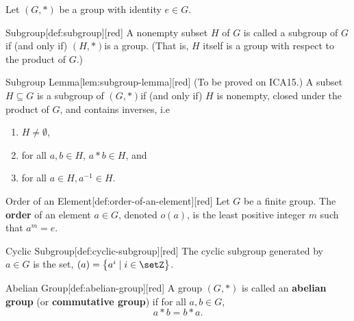 Let $(G, *)$ be a group with identity $e \in G$.
\begin{define}{Subgroup}[def:subgroup][red]
  A nonempty subset $H$ of $G$ is called a subgroup of $G$ if (and only if) $(H, *)$is a group. (That is, $H$ itself is a group with respect to the product of $G$.)
\end{define}
\begin{define}{Subgroup Lemma}[lem:subgroup-lemma][red]
  (To be proved on ICA15.) A subset $H \subseteq G$ is a subgroup of $(G, *)$if (and only if) 
  $H$ is nonempty, closed under the product of $G$, and contains inverses, i.e 
  \begin{enumerate}
    \item $H \neq \emptyset$,
    \item for all $a, b \in H$, $a * b \in H$, and
    \item for all $a \in H, a^{-1} \in H$.
  \end{enumerate}
\end{define}
\begin{define}{Order of an Element}[def:order-of-an-element][red]
  Let $G$ be a finite group. The \textbf{order} of an 
  element $a \in G$, denoted $o(a)$, is the least positive 
  integer $m$ such that $a^m=e$.
\end{define}
\begin{define}{Cyclic Subgroup}[def:cyclic-subgroup][red]
  The cyclic subgroup generated by $a \in G$ is the 
  set, $\left(a\right)=\left\{a^i \mid i \in \setZ\right\}$.
\end{define}
\begin{define}{Abelian Group}[def:abelian-group][red]
  A group $(G, *)$ is called an \textbf{abelian group} (or \textbf{commutative group}) if for all $a, b \in G$, 
  \[
    a * b = b * a.
  \]
\end{define}
\newpage
